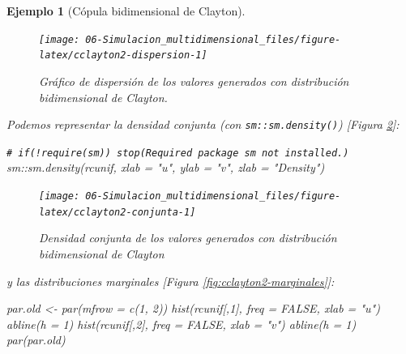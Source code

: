\documentclass[
  10pt,
]{book}
\newenvironment{Shaded}{\begin{snugshade}}{\end{snugshade}}
\newcommand{\AttributeTok}[1]{\textcolor[rgb]{0.77,0.63,0.00}{#1}}
\newcommand{\CommentTok}[1]{\textcolor[rgb]{0.56,0.35,0.01}{\textit{#1}}}
\newcommand{\ConstantTok}[1]{\textcolor[rgb]{0.00,0.00,0.00}{#1}}
\newcommand{\DecValTok}[1]{\textcolor[rgb]{0.00,0.00,0.81}{#1}}
\newcommand{\FunctionTok}[1]{\textcolor[rgb]{0.00,0.00,0.00}{#1}}
\newcommand{\NormalTok}[1]{#1}
\newcommand{\OtherTok}[1]{\textcolor[rgb]{0.56,0.35,0.01}{#1}}
\newcommand{\SpecialCharTok}[1]{\textcolor[rgb]{0.00,0.00,0.00}{#1}}
\newcommand{\StringTok}[1]{\textcolor[rgb]{0.31,0.60,0.02}{#1}}
\theoremstyle{break}
\newtheorem{example}{Ejemplo}[chapter]
\theoremstyle{nonumberplain}
\renewcommand{\CommentTok}[1]{\textcolor[rgb]{0.41,0.41,0.41}{\texttt{#1}}}
\begin{document}
\begin{example}[Cópula bidimensional de Clayton]
\begin{figure}[!htbp]

{\centering \texttt{[image: 06-Simulacion\_multidimensional\_files/figure-latex/cclayton2-dispersion-1]} 

}

\caption{Gráfico de dispersión de los valores generados con distribución bidimensional de Clayton.}\label{fig:cclayton2-dispersion}
\end{figure}

Podemos representar la densidad conjunta (con \texttt{sm::sm.density()}) {[}Figura \ref{fig:cclayton2-conjunta}{]}:

\begin{Shaded}
\begin{Highlighting}[]
\CommentTok{\# if(!require(sm)) stop(\textquotesingle{}Required package \textasciigrave{}sm\textasciigrave{} not installed.\textquotesingle{})}
\NormalTok{sm}\SpecialCharTok{::}\FunctionTok{sm.density}\NormalTok{(rcunif, }\AttributeTok{xlab =} \StringTok{"u"}\NormalTok{, }\AttributeTok{ylab =} \StringTok{"v"}\NormalTok{, }\AttributeTok{zlab =} \StringTok{"Density"}\NormalTok{)    }
\end{Highlighting}
\end{Shaded}

\begin{figure}[!htbp]

{\centering \texttt{[image: 06-Simulacion\_multidimensional\_files/figure-latex/cclayton2-conjunta-1]} 

}

\caption{Densidad conjunta de los valores generados con distribución bidimensional de Clayton}\label{fig:cclayton2-conjunta}
\end{figure}

y las distribuciones marginales {[}Figura \ref{fig:cclayton2-marginales}{]}:

\begin{Shaded}
\begin{Highlighting}[]
\NormalTok{par.old }\OtherTok{\textless{}{-}} \FunctionTok{par}\NormalTok{(}\AttributeTok{mfrow =} \FunctionTok{c}\NormalTok{(}\DecValTok{1}\NormalTok{, }\DecValTok{2}\NormalTok{))}
\FunctionTok{hist}\NormalTok{(rcunif[,}\DecValTok{1}\NormalTok{], }\AttributeTok{freq =} \ConstantTok{FALSE}\NormalTok{, }\AttributeTok{xlab =} \StringTok{"u"}\NormalTok{)}
\FunctionTok{abline}\NormalTok{(}\AttributeTok{h =} \DecValTok{1}\NormalTok{)}
\FunctionTok{hist}\NormalTok{(rcunif[,}\DecValTok{2}\NormalTok{], }\AttributeTok{freq =} \ConstantTok{FALSE}\NormalTok{, }\AttributeTok{xlab =} \StringTok{"v"}\NormalTok{)}
\FunctionTok{abline}\NormalTok{(}\AttributeTok{h =} \DecValTok{1}\NormalTok{)}
\FunctionTok{par}\NormalTok{(par.old)}
\end{Highlighting}
\end{Shaded}


\end{example}
\end{document}

